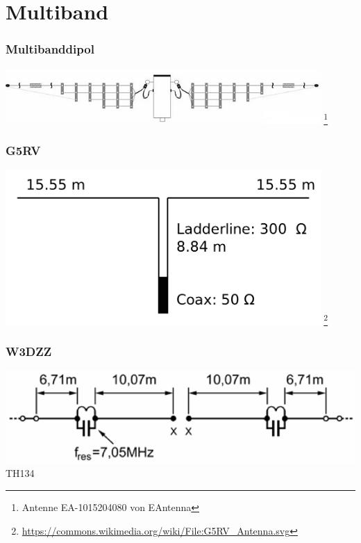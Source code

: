\section*{Multiband}

\begin{frame}
  \frametitle{Multibanddipol}
  \begin{center}
    \includegraphics[width=0.9\textwidth]{a09/Multiband.jpg}
    \footnote{\tiny Antenne EA-1015204080 von EAntenna}
  \end{center}
\end{frame}

\begin{frame}
  \frametitle{G5RV}
  \begin{center}
    \includegraphics[width=0.9\textwidth]{a09/G5RV_Antenna.png}
    \footnote{\tiny \url{https://commons.wikimedia.org/wiki/File:G5RV_Antenna.svg}}
  \end{center}
\end{frame}

\begin{frame}
  \frametitle{W3DZZ}
  \begin{center}
    \includegraphics[width=1\textwidth]{a09/W3DZZ.png}
    \tiny \hyperlink{refs}{\cite{bna}} TH134
  \end{center}
\end{frame}

